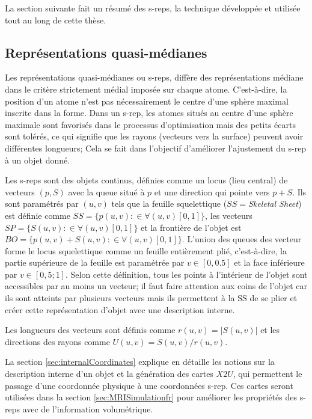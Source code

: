 La section suivante fait un résumé des s-reps, la technique développée et utilisée tout au long de cette thèse.

\subsection{Représentations quasi-médianes}

Les représentations quasi-médianes \cite{pizer_nested_2012} ou s-reps, diffère des représentations 
médiane dans le critère strictement médial imposée sur chaque atome. 
C'est-à-dire, la position d'un atome n'est pas nécessairement le centre d'une sphère maximal inscrite dans la forme.
Dans un s-rep, les atomes situés au centre d'une sphère maximale sont favorisés dans le processus d'optimisation 
mais des petits écarts sont tolérés, 
ce qui signifie que les rayons (vecteurs vers la surface) peuvent avoir différentes longueurs;
Cela se fait dans l'objectif d'améliorer l'ajustement du s-rep à un objet donné.

Les s-reps sont des objets continus, définies comme un locus (lieu central) de vecteurs $(p, S)$ 
avec la queue situé à $p$ et une direction qui pointe vers $p + S$. 
Ils sont paramétrés par $(u, v)$ tels que la feuille squelettique ($SS=$\textit{Skeletal Sheet}) est définie comme 
$SS = \{p (u, v): \in \forall (u, v) [0, 1] \} $, 
les vecteurs $SP = \{S (u, v): \in \forall (u, v) [0, 1] \} $ et la frontière de l'objet est 
$BO = \{p (u, v) + S (u, v): \in \forall (u, v) [0, 1] \} $.
L'union des queues des vecteur forme le locus squelettique comme un feuille entièrement plié, 
c'est-à-dire, la partie supérieure de la feuille est paramétrée par $v \in [0, 0.5] $ et la face inférieure par $v \in [0,5; 1]$.
Selon cette définition, tous les points à l'intérieur de l'objet sont accessibles par au moins un vecteur; 
il faut faire attention aux coins de l'objet car ils sont atteints par plusieurs 
vecteurs mais ils permettent à la SS de se plier et créer cette représentation d'objet avec une description interne.

Les longueurs des vecteurs sont définis comme $r (u, v) = |S (u, v) | $ et les directions des rayons comme $U (u, v) = S (u, v) / r (u, v) $.

La section \ref{sec:internalCoordinates} explique en détaille les notions sur la description interne d'un objet et la génération des cartes $X2U$, qui permettent le passage d'une coordonnée physique à une coordonnées s-rep.
Ces cartes seront utilisées dans la section \ref{sec:MRISimulationfr} pour améliorer les propriétés des s-reps avec de l’information volumétrique.

